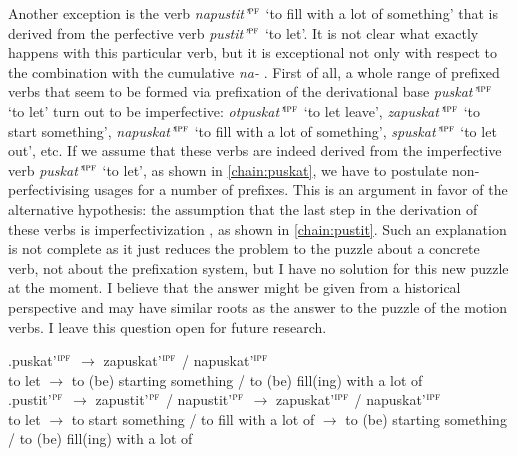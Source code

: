 Another exception is the verb \textit{napustit'}$^{\textsc{pf}}$ `to fill with a lot of something' that is derived from the perfective verb  \textit{pustit'}$^{\textsc{pf}}$ `to let'. It is not clear what exactly happens with this particular verb, but it is exceptional not only with respect to the combination with the cumulative  \textit{na-}  . First of all, a whole range of prefixed verbs that seem to be formed via prefixation  of the derivational base \textit{puskat'}$^{\textsc{ipf}}$ `to let' turn out to be imperfective: \textit{otpuskat'}$^{\textsc{ipf}}$ `to let leave', \textit{zapuskat'}$^{\textsc{ipf}}$ `to start something', \textit{napuskat'}$^{\textsc{ipf}}$ `to fill with a lot of something', \textit{spuskat'}$^{\textsc{ipf}}$ `to let out', etc. If we assume that these verbs are indeed derived from the imperfective verb  \textit{puskat'}$^{\textsc{ipf}}$ `to let', as shown in \ref{chain:puskat}, we have to postulate non-perfectivising usages for a number of prefixes. This is an argument in favor of the alternative hypothesis: the assumption that the last step in the derivation of these verbs is imperfectivization , as shown in \ref{chain:pustit}. Such an explanation is not complete as it just reduces the problem to the puzzle about a concrete verb, not about the prefixation  system, but I have no solution for this new puzzle at the moment. I believe that the answer might be given from a historical perspective and may have similar roots as the answer to the puzzle of the motion verbs. I leave this question open for future  research.

\exg.puskat'$^{\textsc{ipf}}$ $\rightarrow$ zapuskat'$^{\textsc{ipf}}$ / napuskat'$^{\textsc{ipf}}$ \label{chain:puskat}\\
{to let} $\rightarrow$ {to (be) starting something} / {to (be) fill(ing) with a lot of}\\

\exg.pustit'$^{\textsc{pf}}$ $\rightarrow$ zapustit'$^{\textsc{pf}}$ / napustit'$^{\textsc{pf}}$ $\rightarrow$ zapuskat'$^{\textsc{ipf}}$ / napuskat'$^{\textsc{ipf}}$ \label{chain:pustit}\\
{to let} $\rightarrow$ {to start something} / {to fill with a lot of} $\rightarrow$ {to (be) starting something} / {to (be) fill(ing) with a lot of}\\

